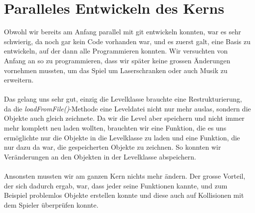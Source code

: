\documentclass[11pt,a4paper]{scrbook}
\begin{document}
\section{Paralleles Entwickeln des Kerns}
Obwohl wir bereits am Anfang parallel mit git entwickeln konnten, war es sehr schwierig, da noch gar kein Code vorhanden war,
und es zuerst galt, eine Basis zu entwickeln, auf der dann alle Programmieren konnten. Wir versuchten von Anfang an so zu programmieren,
dass wir später keine grossen Änderungen vornehmen mussten, um das Spiel um Laserschranken oder auch Musik zu erweitern.
\\
\\
Das gelang uns sehr gut, einzig die Levelklasse brauchte eine Restrukturierung, da die \textit{loadFromFile()}-Methode eine Leveldatei nicht nur mehr auslas,
sondern die Objekte auch gleich zeichnete. Da wir die Level aber speichern und nicht immer mehr komplett neu laden wollten, brauchten wir eine
Funktion, die es uns ermöglichte nur die Objekte in die Levelklasse zu laden und eine Funktion, die nur dazu da war, die gespeicherten Objekte zu zeichnen. So konnten wir Veränderungen an den Objekten in der Levelklasse abspeichern.
\\
\\
Ansonsten mussten wir am ganzen Kern nichts mehr ändern. Der grosse Vorteil, der sich dadurch ergab, war, dass jeder seine 
Funktionen kannte, und zum Beispiel problemlos Objekte erstellen konnte und diese auch auf Kollisionen mit dem Spieler überprüfen konnte.
\end{document}
